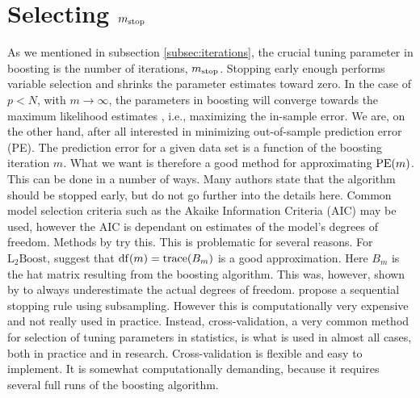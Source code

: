 
\section{Selecting $m_{\text{stop}}$}
As we mentioned in subsection \ref{subsec:iterations}, the crucial tuning parameter in boosting is the number of iterations, $m_{\text{stop}}$. Stopping early enough performs variable selection and shrinks the parameter estimates toward zero. In the case of $p<N$, with $m\to\infty$, the parameters in boosting will converge towards the maximum likelihood estimates \citep{DeBin2016}, i.e., maximizing the in-sample error. We are, on the other hand, after all interested in minimizing out-of-sample prediction error (PE). The prediction error for a given data set is a function of the boosting iteration $m$. What we want is therefore a good method for approximating $\operatorname{PE}(m)$. This can be done in a number of ways. Many authors state that the algorithm should be stopped early, but do not go further into the details here. Common model selection criteria such as the Akaike Information Criteria (AIC) may be used, however the AIC is dependant on estimates of the model's degrees of freedom. Methods by \citet{chang2010} try this. This is problematic for several reasons. For $\text{L}_2\text{Boost}$, \citet{buhlmann2007} suggest that $\operatorname{df}(m)=\operatorname{trace}(B_m)$ is a good approximation. Here $B_m$ is the hat matrix resulting from the boosting algorithm. This was, however, shown by \citet{hastie2007} to always underestimate the actual degrees of freedom. \citet{mayr-hofner} propose a sequential stopping rule using subsampling. However this is computationally very expensive and not really used in practice. Instead, cross-validation, a very common method for selection of tuning parameters in statistics, is what is used in almost all cases, both in practice and in research. Cross-validation is flexible and easy to implement. It is somewhat computationally demanding, because it requires several full runs of the boosting algorithm.


